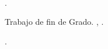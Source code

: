 

\thispagestyle{empty}

\begin{center}
    \textsc{\miNombre} \\ \medskip                        

    \begingroup
        \textsc{\miTitulo}
    \endgroup
\end{center}        

\newpage

\thispagestyle{empty}

\hfill

\vfill

\begin{flushleft}
\noindent\miNombre \textit{\miTitulo}. \\\bigskip

Trabajo de fin de Grado. \miGrado, \miCurso. \\\bigskip

\miUniversidad.
\end{flushleft}

\endinput

